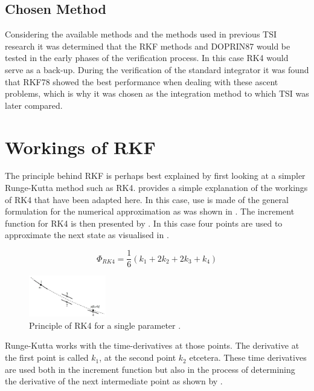 \subsection{Chosen Method}
\label{subsec:chosenMethod}
Considering the available methods and the methods used in previous \ac{TSI} research it was determined that the \ac{RKF} methods and \ac{DOPRIN87} would be tested in the early phases of the verification process. In this case \ac{RK4} would serve as a back-up. During the verification of the standard integrator it was found that \ac{RKF78} showed the best performance when dealing with these ascent problems, which is why it was chosen as the integration method to which \ac{TSI} was later compared.


\section{Workings of \ac{RKF}}
\label{sec:rkf}
The principle behind \ac{RKF} is perhaps best explained by first looking at a simpler Runge-Kutta method such as \ac{RK4}. \cite{noomen2013int} provides a simple explanation of the workings of \ac{RK4} that have been adapted here. In this case, use is made of the general formulation for the numerical approximation as was shown in . The increment function for \ac{RK4} is then presented by . In this case four points are used to approximate the next state as visualised in . 

\begin{equation} \label{eq:rk4_increment}
\Phi_{RK4}=\dfrac{1}{6}\left(k_{1}+2k_{2}+2k_{3}+k_{4}\right)
\end{equation}


\begin{figure}[H]
\centering
\includegraphics[width=0.3\textwidth]{figures/integrators/rk4_noomen2013int.jpg}
\caption{Principle of \ac{RK4} for a single parameter \cite{noomen2013int}.}
\label{fig:rk4_noomen2013int}
\end{figure}

\noindent
Runge-Kutta works with the time-derivatives at those points. The derivative at the first point is called $k_{1}$, at the second point $k_{2}$ etcetera. These time derivatives are used both in the increment function but also in the process of determining the derivative of the next intermediate point as shown by .

